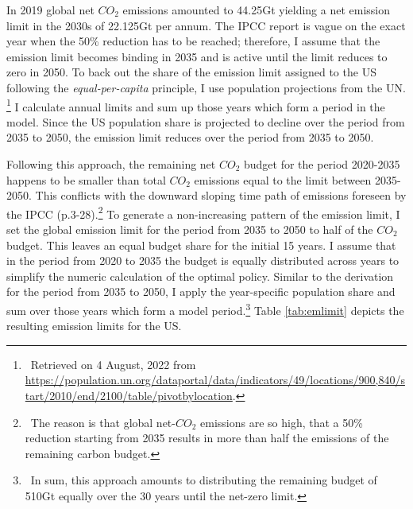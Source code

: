 % 
 In 2019 global net $CO_2$ emissions amounted to 44.25Gt \citep[compare figure SPM1.a p.11 in ][]{IPCCSPM} yielding a net emission limit in the 2030s of 22.125Gt per annum. The IPCC report is vague on the exact year when the 50\% reduction has to be reached; therefore, I assume that the emission limit becomes binding in 2035 and is active until the limit reduces to zero in 2050. 
 To back out the share of the emission limit assigned to the US following the \textit{equal-per-capita} principle, I use population projections from the UN.
 \footnote{\ Retrieved on 4 August, 2022 from \url{https://population.un.org/dataportal/data/indicators/49/locations/900,840/start/2010/end/2100/table/pivotbylocation}.} 
 I calculate annual limits and sum up those years which form a period in the model.  Since the US population share is projected to decline over the period from 2035 to 2050, the emission limit reduces over the period from 2035 to 2050. 
 
 Following this approach, the remaining net $CO_2$ budget for the period 2020-2035 happens to be smaller than total $CO_2$ emissions equal to the limit between 2035-2050. This conflicts with the downward sloping time path of emissions foreseen by the IPCC (p.3-28).\footnote{\ The reason is that global net-$CO_2$ emissions are so high, that a 50\% reduction starting from 2035 results in more than half the emissions of the remaining carbon budget. }
 To generate a non-increasing pattern of the emission limit, I set the global emission limit for the period from 2035 to 2050 to half of the $CO_2$ budget. This leaves an equal budget share for the initial 15 years. I assume that in the period from 2020 to 2035 the budget is equally distributed across years to simplify the numeric calculation of the optimal policy. Similar to the derivation for the period from 2035 to 2050, I apply the year-specific population share and sum over those years which form a model period.\footnote{\ In sum, this approach amounts to distributing the remaining budget of 510Gt equally over the 30 years until the net-zero limit.} Table \ref{tab:emlimit}  depicts the resulting emission limits for the US.
 
